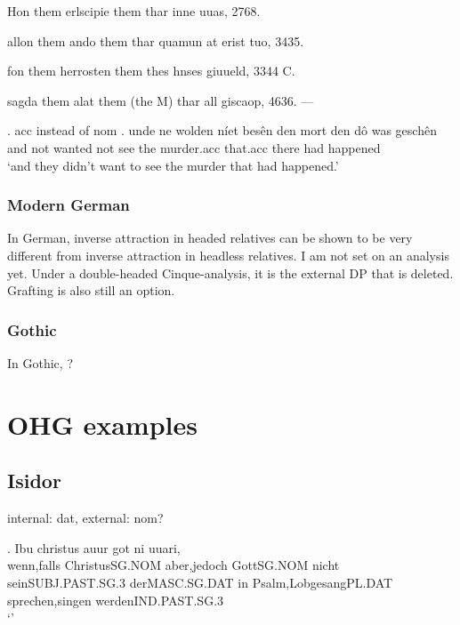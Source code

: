 Hon them erlscipie them thar inne uuas, 2768.

allon them ando them thar quamun at erist tuo, 3435.

fon them herrosten them thes hnses giuueld, 3344 C.

sagda them alat them (the M) thar all giscaop, 4636. —



\ex. \ac{acc} instead of \ac{nom}
\ag. unde ne wolden níet besên den mort den dô was geschên\\
 and not wanted not see the murder.\ac{acc} that.\ac{acc} there had happened\\
 `and they didn't want to see the murder that had happened.' 



\subsection{Modern German}
In German, inverse attraction in headed relatives can be shown to be very different from inverse attraction in headless relatives. I am not set on an analysis yet. Under a double-headed Cinque-analysis, it is the external DP that is deleted. Grafting is also still an option.


\subsection{Gothic}
In Gothic, ?







\chapter{OHG examples}

\section{Isidor}

internal: dat, external: nom?

\exg. Ibu christus auur got ni uuari,     \\
wenn,falls ChristusSG.NOM aber,jedoch GottSG.NOM nicht seinSUBJ.PAST.SG.3 derMASC.SG.DAT in Psalm,LobgesangPL.DAT sprechen,singen werdenIND.PAST.SG.3\\
`' 

